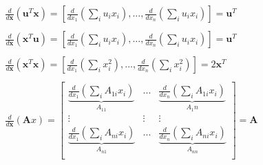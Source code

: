 \begin{equation}
\begin{array}{l}
\frac{d}{d\mathbf{x}} \left(\mathbf{u}^T\mathbf{x}\right) = \left[\frac{d}{dx_1}\left(\sum_i u_i x_i\right),...,\frac{d}{dx_n}\left(\sum_i u_i x_i\right)\right] = \mathbf{u}^T\\
\\
\frac{d}{d\mathbf{x}} \left(\mathbf{x}^T\mathbf{u}\right) = \left[\frac{d}{dx_1}\left(\sum_i u_i x_i\right),...,\frac{d}{dx_n}\left(\sum_i u_i x_i\right)\right] = \mathbf{u}^T\\
\\
\frac{d}{d\mathbf{x}} \left(\mathbf{x}^T\mathbf{x}\right) = \left[\frac{d}{dx_1}\left(\sum_i x_i^2\right),...,\frac{d}{dx_n}\left(\sum_i x_i^2\right)\right] = 2\mathbf{x}^T\\
\\
\frac{d}{d\mathbf{x}} \left(\mathbf{A}x\right) = \left[
\begin{array}{ccc} 
\underbrace{\frac{d}{dx_1}\left(\sum_i A_{1i} x_i\right)}_{A_{11}} &...& \underbrace{\frac{d}{dx_n}\left(\sum_i A_{1i} x_i\right)}_{A_1n}\\
\vdots&\vdots&\vdots\\
\underbrace{\frac{d}{dx_1}\left(\sum_i A_{ni} x_i\right)}_{A_{n1}} &...& \underbrace{\frac{d}{dx_n}\left(\sum_i A_{ni} x_i\right)}_{A_{nn}}\\
\end{array}\right] = \mathbf{A}\\
\end{array}
\end{equation}


\chapauthor{}
